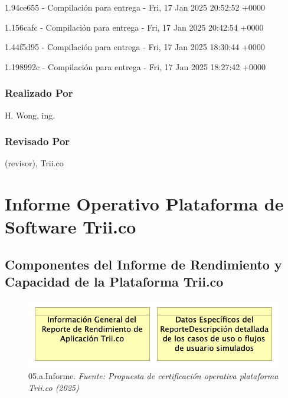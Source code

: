 \documentclass[
  paper=a4,
  ,captions=tableheading
]{scrartcl}
\renewenvironment{quote}{\begin{customblockquote}\list{}{\rightmargin=0em\leftmargin=0em}%
\item\relax\color{blockquote-text}\ignorespaces}{\unskip\unskip\endlist\end{customblockquote}}
\begin{document}
1.94ce655 - Compilación para entrega - Fri, 17 Jan 2025 20:52:52 +0000

1.156cafc - Compilación para entrega - Fri, 17 Jan 2025 20:42:54 +0000

1.44f5d95 - Compilación para entrega - Fri, 17 Jan 2025 18:30:44 +0000

1.198992c - Compilación para entrega - Fri, 17 Jan 2025 18:27:42 +0000

\subsubsection{Realizado Por}\label{sec:realizado-por}

H. Wong, ing.

\subsubsection{Revisado Por}\label{sec:revisado-por}

(revisor), Trii.co

\newpage

\section{Informe Operativo Plataforma de Software
Trii.co}\label{sec:informe-operativo-plataforma-de-software-trii.co}

\subsection{Componentes del Informe de Rendimiento y Capacidad de la
Plataforma
Trii.co}\label{sec:componentes-del-informe-de-rendimiento-y-capacidad-de-la-plataforma-trii.co}

\begin{quote}
\end{quote}

\begin{figure}
\centering
\includegraphics{images/05.a.Informe.png}
\caption{05.a.Informe. \emph{Fuente: Propuesta de certificación
operativa plataforma Trii.co
(2025)}}\label{fig:id-04abc8f16f354757a52791da825e4049}
\end{figure}
\end{document}
